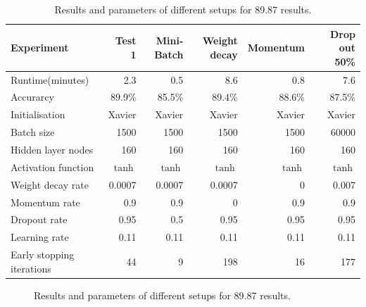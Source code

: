 \begin{table}
\caption{Results and parameters of different setups for 89.87 results.}
{\footnotesize \centering
\begin{tabular}{@{}lrrrrr@{}}
\toprule
Experiment                & Test 1  & Mini-Batch & Weight decay & Momentum & Drop out 50\% \\ \midrule
Runtime(minutes)          & 2.3     & 0.5        & 8.6          & 0.8      & 7.6           \\
Accurarcy                 & 89.9\%  & 85.5\%     & 89.4\%       & 88.6\%   & 87.5\%        \\
Initialisation            & Xavier  & Xavier     & Xavier       & Xavier   & Xavier        \\
Batch size                & 1500    & 1500       & 1500         & 1500     & 60000         \\
Hidden layer nodes        & 160     & 160        & 160          & 160      & 160           \\
Activation function       & $\tanh$ & $\tanh$    & $\tanh$      & $\tanh$  & $\tanh$       \\
Weight decay rate         & 0.0007  & 0.0007     & 0.0007       & 0        & 0.007         \\
Momentum rate             & 0.9     & 0.9        & 0            & 0.9      & 0.9           \\
Dropout rate              & 0.95    & 0.5        & 0.95         & 0.95     & 0.95          \\
Learning rate             & 0.11    & 0.11       & 0.11         & 0.11     & 0.11          \\
Early stopping iterations & 44      & 9          & 198          & 16       & 177           \\ \bottomrule
\end{tabular}
}
\end{table}

\begin{figure}
    \caption{\label{fig:my-label}Results and parameters of different setups for 89.87 results.}
\end{figure}

